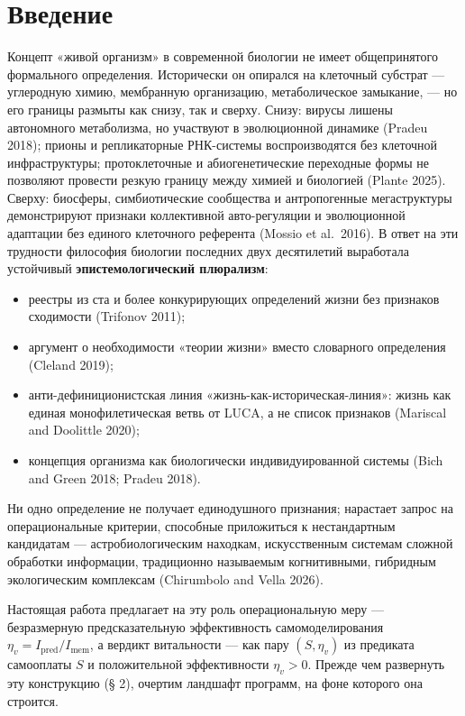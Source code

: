 \documentclass[pdflatex,sn-mathphys-ay]{sn-jnl}
\providecommand{\tightlist}{\setlength{\itemsep}{0pt}\setlength{\parskip}{0pt}}
\begin{document}
\section{Введение}\label{ux432ux432ux435ux434ux435ux43dux438ux435}

Концепт «живой организм» в современной биологии не имеет общепринятого формального определения. Исторически он опирался на клеточный субстрат --- углеродную химию, мембранную организацию, метаболическое замыкание, --- но его границы размыты как снизу, так и сверху. Снизу: вирусы лишены автономного метаболизма, но участвуют в эволюционной динамике (Pradeu 2018); прионы и репликаторные РНК-системы воспроизводятся без клеточной инфраструктуры; протоклеточные и абиогенетические переходные формы не позволяют провести резкую границу между химией и биологией (Plante 2025). Сверху: биосферы, симбиотические сообщества и антропогенные мегаструктуры демонстрируют признаки коллективной авто-регуляции и эволюционной адаптации без единого клеточного референта (Mossio et al.~2016). В ответ на эти трудности философия биологии последних двух десятилетий выработала устойчивый \textbf{эпистемологический плюрализм}:

\begin{itemize}
\tightlist
\item
  реестры из ста и более конкурирующих определений жизни без признаков сходимости (Trifonov 2011);
\item
  аргумент о необходимости «теории жизни» вместо словарного определения (Cleland 2019);
\item
  анти-дефиниционистская линия «жизнь-как-историческая-линия»: жизнь как единая монофилетическая ветвь от LUCA, а не список признаков (Mariscal and Doolittle 2020);
\item
  концепция организма как биологически индивидуированной системы (Bich and Green 2018; Pradeu 2018).
\end{itemize}

Ни одно определение не получает единодушного признания; нарастает запрос на операциональные критерии, способные приложиться к нестандартным кандидатам --- астробиологическим находкам, искусственным системам сложной обработки информации, традиционно называемым когнитивными, гибридным экологическим комплексам (Chirumbolo and Vella 2026).

Настоящая работа предлагает на эту роль операциональную меру --- безразмерную предсказательную эффективность самомоделирования \(\eta_v = I_{\text{pred}}/I_{\text{mem}}\), а вердикт витальности --- как пару \((S, \eta_v)\) из предиката самооплаты \(S\) и положительной эффективности \(\eta_v > 0\). Прежде чем развернуть эту конструкцию (§ 2), очертим ландшафт программ, на фоне которого она строится.
\end{document}
